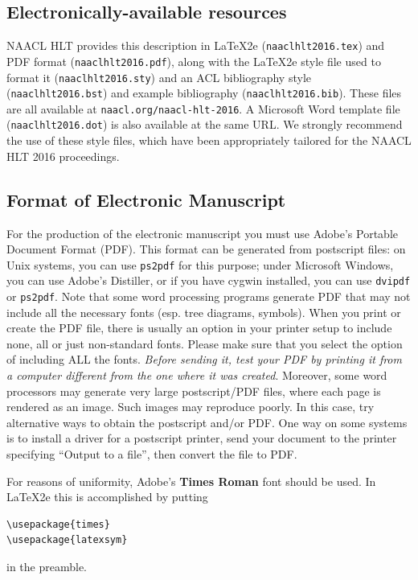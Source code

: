\documentclass[11pt,letterpaper]{article}
\begin{document}
\subsection{Electronically-available resources}

NAACL HLT provides this description in \LaTeX2e{} ({\small\tt naaclhlt2016.tex}) and PDF
format ({\small\tt naaclhlt2016.pdf}), along with the \LaTeX2e{} style file used to
format it ({\small\tt naaclhlt2016.sty}) and an ACL bibliography style ({\small\tt naaclhlt2016.bst})
and example bibliography ({\small\tt naaclhlt2016.bib}).
These files are all available at
{\small\tt naacl.org/naacl-hlt-2016}.  A Microsoft Word
template file ({\small\tt naaclhlt2016.dot}) is also available at the same URL. We
strongly recommend the use of these style files, which have been
appropriately tailored for the NAACL HLT 2016 proceedings.

\subsection{Format of Electronic Manuscript}
\label{sect:pdf}

For the production of the electronic manuscript you must use Adobe's
Portable Document Format (PDF). This format can be generated from
postscript files: on Unix systems, you can use {\small\tt ps2pdf} for this
purpose; under Microsoft Windows, you can use Adobe's Distiller, or
if you have cygwin installed, you can use {\small\tt dvipdf} or
{\small\tt ps2pdf}.  Note 
that some word processing programs generate PDF that may not include
all the necessary fonts (esp. tree diagrams, symbols). When you print
or create the PDF file, there is usually an option in your printer
setup to include none, all or just non-standard fonts.  Please make
sure that you select the option of including ALL the fonts.  {\em
  Before sending it, test your {\/\em PDF} by printing it from a
  computer different from the one where it was created}. Moreover,
some word processors may generate very large postscript/PDF files,
where each page is rendered as an image. Such images may reproduce
poorly.  In this case, try alternative ways to obtain the postscript
and/or PDF.  One way on some systems is to install a driver for a
postscript printer, send your document to the printer specifying
``Output to a file'', then convert the file to PDF.

For reasons of uniformity, Adobe's {\bf Times Roman} font should be
used. In \LaTeX2e{} this is accomplished by putting
\small
\begin{verbatim}
\usepackage{times}
\usepackage{latexsym}
\end{verbatim}
\normalsize
in the preamble.
\end{document}
